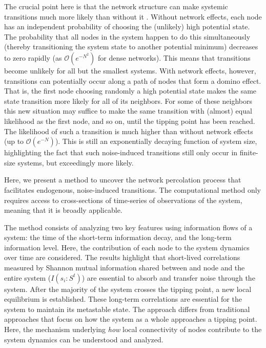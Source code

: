 \documentclass[a4paper, 11pt, twocolumn]{article}
\begin{document}
The crucial  point here  is that  the network  structure can
make systemic  transitions much more likely  than without it
\cite{Harush2017a,Gao2016,Wunderling2020,Wunderling2021}.
Without  network  effects,  each  node  has  an  independent
probability of choosing the (unlikely) high potential state.
The probability  that all nodes  in the system happen  to do
this simultaneously (thereby  transitioning the system state
to another potential minimum)  decreases to zero rapidly (as
\(\mathcal{O}(e^{-N^2})\)  for dense  networks). This  means
that transitions  become unlikely  for all but  the smallest
systems.  With  network  effects, however,  transitions  can
potentially occur along  a path of nodes that  form a domino
effect. That  is, the  first node  choosing randomly  a high
potential state makes the  same state transition more likely
for all of  its neighbors. For some of  these neighbors this
new situation may  suffice to make the  same transition with
(almost)  equal likelihood  as the  first node,  and so  on,
until the tipping point has  been reached. The likelihood of
such  a  transition  is  much higher  than  without  network
effects (up  to \(\mathcal{O}(e^{-N})\)).  This is  still an
exponentially decaying function of system size, highlighting
the  fact that  such  noise-induced  transitions still  only
occur in finite-size systems, but exceedingly more likely.

Here, we present a method to uncover the network percolation
process    that   facilitates    endogenous,   noise-induced
transitions. The  computational method only  requires access
to  cross-sections of  time-series  of  observations of  the
system, meaning that it is broadly applicable.

The  method consists  of  analyzing two  key features  using
information flows  of a system:  the time of  the short-term
information  decay,  and  the long-term  information  level.
Here, the contribution  of each node to  the system dynamics
over  time  are  considered.   The  results  highlight  that
short-lived   correlations   measured  by   Shannon   mutual
information shared  between and  node and the  entire system
(\(I(s_i  : S^t)\))  are  essential to  absorb and  transfer
noise through the  system. After the majority  of the system
crosses  the  tipping  point,  a new  local  equilibrium  is
established. These long-term  correlations are essential for
the system  to maintain  its metastable state.  The approach
differs from  traditional approaches  that focus on  how the
system  as a  whole approaches  a tipping  point. Here,  the
mechanism  underlying  \emph{how}  local  connectivity  of  nodes
contribute  to the  system  dynamics can  be understood  and
analyzed.
\end{document}
